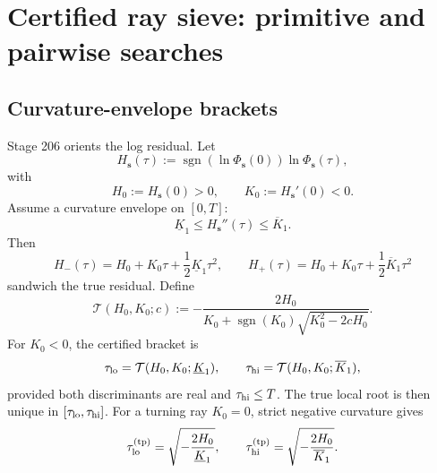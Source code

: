 
\section{Certified ray sieve: primitive and pairwise searches}
\label{sec:app-part06-certified-ray-sieve-primitive-pairwise}

\subsection{Curvature-envelope brackets}
\label{subsec:app-part06-curvature-envelope-brackets}

Stage 206 orients the log residual.  Let
\begin{equation}
\label{eq:app-part06-oriented-H}
H_{\mathbf s}(\tau):=
\operatorname{sgn}(\ln\Phi_{\mathbf s}(0))\ln\Phi_{\mathbf s}(\tau),
\end{equation}
with
\begin{equation}
\label{eq:app-part06-H0-K0}
H_0:=H_{\mathbf s}(0)>0,
\qquad
K_0:=H_{\mathbf s}'(0)<0.
\end{equation}
Assume a curvature envelope on \([0,T]\):
\begin{equation}
\label{eq:app-part06-curvature-envelope}
\underline K_1\le H_{\mathbf s}''(\tau)\le\overline K_1.
\end{equation}
Then
\begin{equation}
\label{eq:app-part06-comparison-functions}
H_-(\tau)=H_0+K_0\tau+\frac12\underline K_1\tau^2,
\qquad
H_+(\tau)=H_0+K_0\tau+\frac12\overline K_1\tau^2
\end{equation}
sandwich the true residual.  Define
\begin{equation}
\label{eq:app-part06-root-map}
\mathcal T(H_0,K_0;c)
:=-\frac{2H_0}{K_0+\operatorname{sgn}(K_0)\sqrt{K_0^2-2cH_0}}.
\end{equation}
For \(K_0<0\), the certified bracket is
\begin{equation}
\label{eq:app-part06-certified-bracket}
\tau_{\rm lo}=\mathcal T(H_0,K_0;\underline K_1),
\qquad
\tau_{\rm hi}=\mathcal T(H_0,K_0;\overline K_1),
\end{equation}
provided both discriminants are real and \(\tau_{\rm hi}\le T\).  The true local root is then unique in \([\tau_{\rm lo},\tau_{\rm hi}]\).  For a turning ray \(K_0=0\), strict negative curvature gives
\begin{equation}
\label{eq:app-part06-turning-bracket}
\tau_{\rm lo}^{\rm(tp)}=\sqrt{-\frac{2H_0}{\underline K_1}},
\qquad
\tau_{\rm hi}^{\rm(tp)}=\sqrt{-\frac{2H_0}{\overline K_1}}.
\end{equation}

